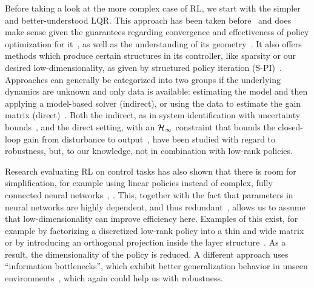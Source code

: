 Before taking a look at the more complex case of RL, we start with
the simpler and better-understood LQR. This approach has been taken
before~\cite{Recht2019Tour} and does make sense given the guarantees regarding convergence and
effectiveness of policy optimization for it~\cite{Fazel2018Global,Takakura2023Structured}, as well
as the understanding of its geometry~\cite{Talebi2024Policy}.
It also offers methods which produce certain structures in its controller, like sparsity or our desired
low-dimensionality, as given by structured policy
iteration (S-PI)~\cite{Park2020Structured}. Approaches can generally be categorized into two groups if the underlying dynamics
are unknown and only data is available: estimating the model and then applying a model-based solver (indirect), or using the data
to estimate the gain matrix (direct)~\cite{Zhao2024DataEnabled}. Both the indirect, as in system identification
with uncertainty bounds~\cite{Dean2020Sample}, and the direct setting, with an $\mathcal{H}_{\infty}$ constraint
that bounds the closed-loop gain from disturbance to output~\cite{Zhang2021Policy},
have been studied with regard to robustness, but, to our knowledge, not in combination with low-rank policies.

Research evaluating RL on control tasks has also shown that there is room for simplification, for
example using linear policies instead of complex, fully connected neural
networks~\cite[Sec.~4.2]{Mania2018Simple}, \cite{Rajeswaran2017Towards}. This, together with the
fact that parameters in neural networks are highly dependent, and thus redundant~\cite{Denil2013Predicting}, allows us to assume that
low-dimensionality can improve efficiency here. Examples of this exist, for example by factorizing a discretized low-rank
policy into a thin and wide matrix~\cite{Rozada2024Matrix} or by introducing an orthogonal projection inside the layer
structure~\cite{Todorov2026Orthogonal}. As a result, the dimensionality of the policy is reduced. A different approach uses ``information bottlenecks'',
which exhibit better generalization behavior in unseen environments~\cite[Sec.~4.2]{Igl2019Generalization},
which again could help us with robustness.

